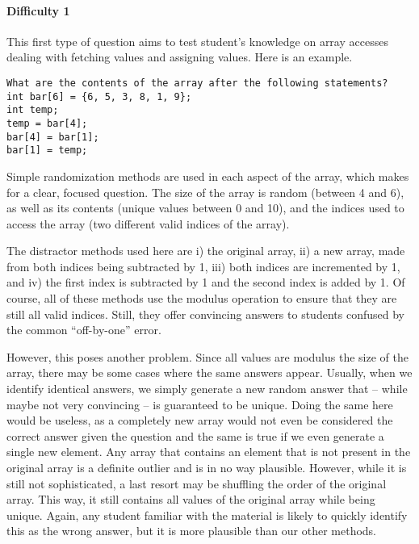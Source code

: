 \documentclass{article}
\begin{document}
\paragraph{Difficulty 1} \hfill \par

This first type of question aims to test student's knowledge on array accesses dealing with fetching values and assigning values. Here is an example.

\begin{lstlisting}
What are the contents of the array after the following statements? 
int bar[6] = {6, 5, 3, 8, 1, 9}; 
int temp; 
temp = bar[4]; 
bar[4] = bar[1]; 
bar[1] = temp; 
\end{lstlisting}

Simple randomization methods are used in each aspect of the array, which makes for a clear, focused question. The size of the array is random (between 4 and 6), as well as its contents
(unique values between 0 and 10), and the indices used to access the array (two different valid indices of the array). 

The distractor methods used here are i) the original array, ii) a new array, made from both indices being subtracted by 1, iii) both indices are incremented by 1, and iv) the first index is
subtracted by 1 and the second index is added by 1. Of course, all of these methods use the modulus operation to ensure that they are still all valid indices. Still, they offer convincing 
answers to students confused by the common ``off-by-one'' error. 

However, this poses another problem. Since all values are modulus the size of the array, there may be some cases where the same answers appear. Usually, when we identify identical answers,
we simply generate a new random answer that -- while maybe not very convincing -- is guaranteed to be unique. Doing the same here would be useless, as a completely new array would not
even be considered the correct answer given the question and the same is true if we even generate a single new element. Any array that contains an element that is not present in the 
original array is a definite outlier and is in no way plausible. However, while it is still not sophisticated, a last resort may be shuffling the order of the original array. This way, it still contains all
values of the original array while being unique. Again, any student familiar with the material is likely to quickly identify this as the wrong answer, but it is more plausible than our other methods.
\end{document}
